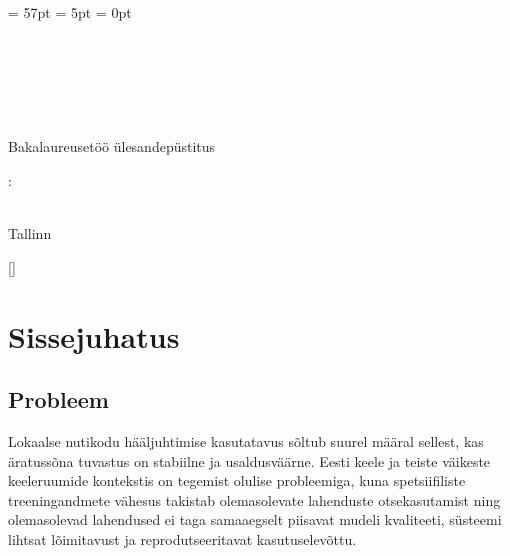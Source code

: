 \documentclass[12pt]{report}
\begin{document}

\hypersetup{pageanchor=false}
\begin{titlepage}
\headheight = 57pt
\footskip = 5pt
\headsep = 0pt

\centering
\universityEst\\
\schoolEst

\vspace*{4.5 cm}

\begin{center}
\authorNameEst~\studentcodeEst\\

\vspace*{1.5 cm}

\begin{Large}
    \fontsize{20}{16}{\textbf{\thesisTitleEst}}\\
\end{Large}

\vspace*{1.5 cm}
Bakalaureusetöö ülesandepüstitus\\
\end{center}

\vspace*{0.6 cm}

\begin{flushright}
  \supervisorEst: \supervisorNameEst\\ \supervisortitleEst\\
\end{flushright}
\vfill

Tallinn \Year
\end{titlepage}
\hypersetup{pageanchor=true}

\setcounter{secnumdepth}{1}
[]

\chapter{Sissejuhatus}

\section{Probleem}
Lokaalse nutikodu hääljuhtimise kasutatavus sõltub suurel määral sellest, kas äratussõna tuvastus on stabiilne ja usaldusväärne. Eesti keele ja teiste väikeste keeleruumide kontekstis on tegemist olulise probleemiga, kuna spetsiifiliste treeningandmete vähesus takistab olemasolevate lahenduste otsekasutamist ning olemasolevad lahendused ei taga samaaegselt piisavat mudeli kvaliteeti, süsteemi lihtsat lõimitavust ja reprodutseeritavat kasutuselevõttu.
\end{document}
